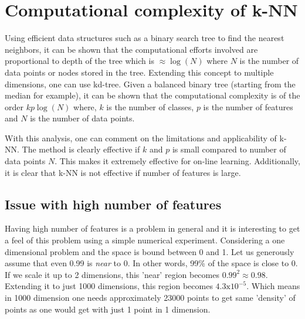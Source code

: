 \documentclass{article}
\begin{document}
\section{Computational complexity of k-NN}
Using efficient data structures such as a binary search tree to find the nearest neighbors, it can be shown that the computational efforts involved are proportional to depth of the tree which is $\approx \log(N)$ where $N$ is the number of data points or nodes stored in the tree. Extending this concept to multiple dimensions, one can use kd-tree. Given a balanced binary tree (starting from the median for example), it can be shown that the computational complexity is of the order $kp\log(N)$ where, $k$ is the number of classes, $p$ is the number of features and $N$ is the number of data points. 

With this analysis, one can comment on the limitations and applicability of k-NN. The method is clearly effective if $k$ and $p$ is small compared to number of data points $N$. This makes it extremely effective for on-line learning. Additionally, it is clear that k-NN is not effective if number of features is large. 

\subsection{Issue with high number of features}
Having high number of features is a problem in general and it is interesting to get a feel of this problem using a simple numerical experiment. Considering a one dimensional problem and the space is bound between 0 and 1. Let us generously assume that even 0.99 is \textit{near} to 0. In other words, 99\% of the space is close to 0. If we scale it up to 2 dimensions, this 'near' region becomes $\mathrm{0.99^2} \approx \mathrm{0.98}$.  Extending it to just 1000 dimensions, this region becomes $\mathrm{4.3 x 10^{-5}}$. Which means in 1000 dimension one needs approximately 23000 points to get same 'density' of points as one would get with just 1 point in 1 dimension.






\end{document}
